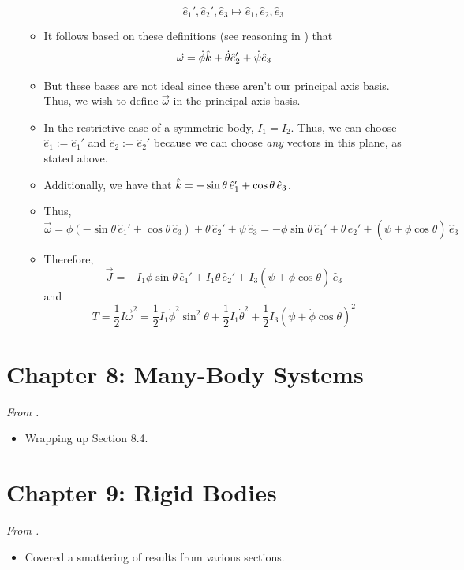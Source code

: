 \documentclass[../notes.tex]{subfiles}
\begin{document}
\begin{itemize}
\begin{itemize}
\begin{enumerate}
            \begin{equation*}
                \hat{e}_1',\hat{e}_2',\hat{e}_3 \mapsto \hat{e}_1,\hat{e}_2,\hat{e}_3
            \end{equation*}
        \end{enumerate}
        \item It follows based on these definitions (see reasoning in \textcite{bib:KibbleBerkshire}) that
        \begin{equation*}
            \vec{\omega} = \dot{\phi}\hat{k}+\dot{\theta}\hat{e}_2'+\dot{\psi}\hat{e}_3
        \end{equation*}
        \item But these bases are not ideal since these aren't our principal axis basis. Thus, we wish to define $\vec{\omega}$ in the principal axis basis.
        \item In the restrictive case of a symmetric body, $I_1=I_2$. Thus, we can choose $\hat{e}_1:=\hat{e}_1'$ and $\hat{e}_2:=\hat{e}_2'$ because we can choose \emph{any} vectors in this plane, as stated above.
        \item Additionally, we have that $\hat{k}=-\sin\theta\,\hat{e}_1'+\cos\theta\,\hat{e}_3$.
        \item Thus,
        \begin{equation*}
            \vec{\omega} = \dot{\phi}(-\sin\theta\,\hat{e}_1'+\cos\theta\,\hat{e}_3)+\dot{\theta}\,\hat{e}_2'+\dot{\psi}\,\hat{e}_3
            = -\dot{\phi}\sin\theta\,\hat{e}_1'+\dot{\theta}\,\hat{e}_2'+(\dot{\psi}+\dot{\phi}\cos\theta)\,\hat{e}_3
        \end{equation*}
        \item Therefore,
        \begin{equation*}
            \vec{J} = -I_1\dot{\phi}\sin\theta\,\hat{e}_1'+I_1\dot{\theta}\,\hat{e}_2'+I_3(\dot{\psi}+\dot{\phi}\cos\theta)\,\hat{e}_3
        \end{equation*}
        and
        \begin{equation*}
            T = \frac{1}{2}I\vec{\omega}^2
            = \frac{1}{2}I_1\dot{\phi}^2\sin^2\theta+\frac{1}{2}I_1\dot{\theta}^2+\frac{1}{2}I_3(\dot{\psi}+\dot{\phi}\cos\theta)^2
        \end{equation*}
    \end{itemize}
\end{itemize}



\section{Chapter 8: Many-Body Systems}
\emph{From \textcite{bib:KibbleBerkshire}.}
\begin{itemize}
    \item {}Wrapping up Section 8.4.
\end{itemize}



\section{Chapter 9: Rigid Bodies}
\emph{From \textcite{bib:KibbleBerkshire}.}
\begin{itemize}
    \item Covered a smattering of results from various sections.
\end{itemize}
\end{document}
